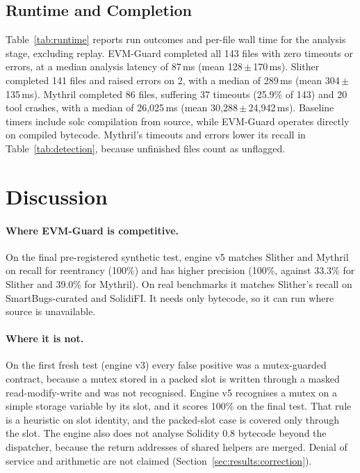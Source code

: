\documentclass[pdflatex,sn-mathphys]{sn-jnl}
\theoremstyle{thmstyleone}
\theoremstyle{thmstyletwo}
\begin{document}
\subsection{Runtime and Completion}\label{sec:results:runtime}
Table~\ref{tab:runtime} reports run outcomes and per-file wall time for the analysis stage, excluding replay. EVM-Guard completed all 143 files with zero timeouts or errors, at a median analysis latency of 87\,ms (mean 128\,$\pm$\,170\,ms). Slither completed 141 files and raised errors on 2, with a median of 289\,ms (mean 304\,$\pm$\,135\,ms). Mythril completed 86 files, suffering 37 timeouts (25.9\% of 143) and 20 tool crashes, with a median of 26,025\,ms (mean 30,288\,$\pm$\,24,942\,ms). Baseline timers include solc compilation from source, while EVM-Guard operates directly on compiled bytecode. Mythril's timeouts and errors lower its recall in Table~\ref{tab:detection}, because unfinished files count as unflagged.

\section{Discussion}\label{sec:disc}

\paragraph{Where EVM-Guard is competitive.} On the final pre-registered synthetic test, engine v5 matches Slither and Mythril on recall for reentrancy (100\%) and has higher precision (100\%, against 33.3\% for Slither and 39.0\% for Mythril). On real benchmarks it matches Slither's recall on SmartBugs-curated and SolidiFI. It needs only bytecode, so it can run where source is unavailable.

\paragraph{Where it is not.} On the first fresh test (engine v3) every false positive was a mutex-guarded contract, because a mutex stored in a packed slot is written through a masked read-modify-write and was not recognised. Engine v5 recognises a mutex on a simple storage variable by its slot, and it scores 100\% on the final test. That rule is a heuristic on slot identity, and the packed-slot case is covered only through the slot. The engine also does not analyse Solidity 0.8 bytecode beyond the dispatcher, because the return addresses of shared helpers are merged. Denial of service and arithmetic are not claimed (Section~\ref{sec:results:correction}).
\end{document}
